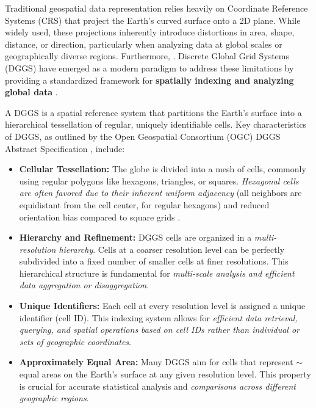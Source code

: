 \begin{multicols}{2}
Traditional geospatial data representation relies heavily on Coordinate Reference Systems (CRS) that project the Earth's curved surface onto a 2D plane.
While widely used, these projections inherently introduce distortions in area, shape, distance, or direction, particularly when analyzing data at global scales or geographically diverse regions. 
Furthermore, . Discrete Global Grid Systems (DGGS) have emerged as a modern paradigm to address these 
limitations by providing a standardized framework for \textbf{spatially indexing and analyzing global data} \cite{ESRI_DGGS_Intro_2023}.

A DGGS is a spatial reference system that partitions the Earth's surface into a hierarchical tessellation of regular, uniquely identifiable cells. 
Key characteristics of DGGS, as outlined by the Open Geospatial Consortium (OGC) DGGS Abstract Specification \cite{OGC_DGGS_Spec}, include:
\begin{itemize}
    \item \textbf{Cellular Tessellation:} The globe is divided into a mesh of cells, commonly using regular polygons like hexagons, triangles, or squares. \textit{Hexagonal cells are often favored due to their inherent uniform adjacency} 
    (all neighbors are equidistant from the cell center, for regular hexagons) and reduced orientation bias compared to square grids \cite{XDGGS_Kmoch_2024}.
    \item \textbf{Hierarchy and Refinement:} DGGS cells are organized in a \textit{multi-resolution hierarchy}. Cells at a coarser resolution level can be perfectly subdivided into a fixed number of smaller cells at finer resolutions. 
    This hierarchical structure is fundamental for \textit{multi-scale analysis and efficient data aggregation or disaggregation}.
    \item \textbf{Unique Identifiers:} Each cell at every resolution level is assigned a unique identifier (cell ID). This indexing system allows for \textit{efficient data retrieval, querying, and spatial operations based on cell IDs rather than individual or sets of geographic coordinates}.
    \item \textbf{Approximately Equal Area:} Many DGGS aim for cells that represent $\sim$equal areas on the Earth's surface at any given resolution level. This property is crucial for accurate statistical analysis and \textit{comparisons across different geographic regions}.
\end{itemize}


\end{multicols}
